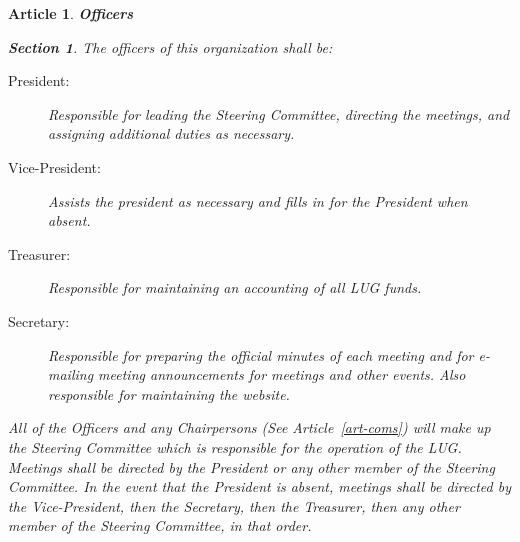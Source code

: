 \documentclass [letterpaper, 12pt]{article}
\newtheorem{art}{Article}
\newtheorem{sect}{Section}[art]
\begin{document}
\bigskip
\begin{art} {\bf Officers}
\label{art-off}

\begin{sect}
The officers of this organization shall be:
\begin{description}
\item[\hspace*{0.25in} President:]
Responsible for leading the Steering Committee, directing 
the meetings, and assigning additional duties as necessary.
\item[\hspace*{0.25in} Vice-President:]
Assists the president as necessary and fills in for the President when
absent.
\item[\hspace*{0.25in} Treasurer:]
Responsible for maintaining an accounting of all LUG funds.
\item[\hspace*{0.25in} Secretary:]
Responsible for preparing the official minutes of each meeting and
for e-mailing meeting announcements for meetings and other events.
Also responsible for maintaining the website.
\end{description}
All of the Officers and any Chairpersons (See Article~\ref{art-coms}) will make up the Steering Committee which is responsible for the operation of the LUG.
Meetings shall be directed by the President or any other member of the Steering Committee.  In the event that the President is absent, meetings shall be directed by the Vice-President, then the Secretary, then the Treasurer, then any other member of the Steering Committee, in that order.

\end{sect}


\end{art}
\end{document}
